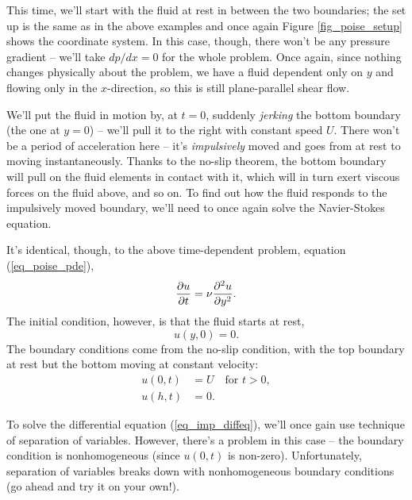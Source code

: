 This time, we'll start with the fluid at rest in between the two boundaries; the set up is the same as in the above examples and  once again Figure \ref{fig_poise_setup} shows the coordinate system.  In this case, though, there won't be any pressure gradient -- we'll take $dp/dx = 0$ for the whole problem.  Once again, since nothing changes physically about the problem, we have a fluid dependent only on $y$ and flowing only in the $x$-direction, so this is still plane-parallel shear flow.  

We'll put the fluid in motion by, at $t = 0$,  suddenly \emph{jerking} the bottom boundary (the one at $y=0$)  -- we'll pull it to the right with constant speed $U$.  There won't be a period of acceleration here -- it's \emph{impulsively} moved and goes from at rest to moving instantaneously.  Thanks to the no-slip theorem, the bottom boundary will pull on the fluid elements in contact with it, which will in turn exert viscous forces on the fluid above, and so on.  To find out how the fluid responds to the impulsively moved boundary, we'll need to once again solve the Navier-Stokes equation.

It's identical, though, to the above time-dependent problem, equation (\ref{eq_poise_pde}),
\begin{equation}
\label{eq_imp_diffeq}
\frac{\partial {u}}{\partial {t}} = \nu \frac{\partial^2 {u}}{\partial {y}^2}.
\end{equation}
The initial condition, however, is that the fluid starts at rest,
\begin{equation}
u(y, 0) = 0.
\end{equation}
The boundary conditions come from the no-slip condition, with the top boundary at rest but the bottom moving at constant velocity:
\begin{align}
u(0, t) & = U \quad \text{for } t>0, \\
u(h, t) & = 0.
\end{align}

To solve the differential equation (\ref{eq_imp_diffeq}), we'll once gain use technique of separation of variables.  However, there's a problem in this case -- the boundary condition is nonhomogeneous (since $u(0,t)$ is non-zero).  Unfortunately, separation of variables breaks down with nonhomogeneous boundary conditions (go ahead and try it on your own!).  

